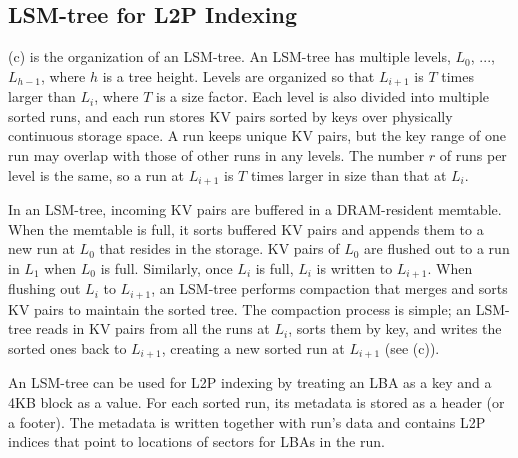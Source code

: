 \begin{comment}
\begin{figure}[t]
\centering
\texttt{[image: figs/OSDI/koo/lsm.eps]}
\vspace{-10pt}
\caption{\fixme{LSM-tree indexing}}
\vspace{-15pt}
\label{fig:LSM-tree}
\end{figure}
\end{comment}


\subsection{LSM-tree for L2P Indexing}
\label{sec:back:lsm-tree}
(c) is the organization of an LSM-tree.  An LSM-tree has
multiple levels, $L_0$, ..., $L_{h-1}$, where $h$ is a tree height.  Levels are
organized so that $L_{i+1}$ is $T$ times larger than $L_{i}$, where $T$ is a
size factor. Each level is also divided into multiple sorted runs, and each run
stores KV pairs sorted by keys over physically continuous storage space.  A run
keeps unique KV pairs, but the key range of one run may overlap with those of
other runs in any levels. The number $r$ of runs per level is the same, so a
run at $L_{i+1}$ is $T$ times larger in size than that at $L_i$.

In an LSM-tree, incoming KV pairs are buffered in a DRAM-resident memtable.
When the memtable is full, it sorts buffered KV pairs and appends them to a new
run at $L_0$ that resides in the storage.  KV pairs of $L_0$ are flushed out to
a run in $L_1$ when $L_0$ is full.  Similarly, once $L_i$ is full, $L_i$ is
written to $L_{i+1}$.  When flushing out $L_i$ to $L_{i+1}$, an LSM-tree
performs compaction that merges and sorts KV pairs to maintain the sorted tree.
The compaction process is simple; an LSM-tree reads in KV pairs from all the
runs at $L_i$, sorts them by key, and writes the sorted ones back to $L_{i+1}$,
creating a new sorted run at $L_{i+1}$ (see (c)).

An LSM-tree can be used for L2P indexing by treating an LBA
as a key and a 4KB block as a value.  For each sorted run, its metadata
is stored as a header (or a footer).  The metadata is written
together with run's data and contains L2P indices 
that point to locations of sectors for LBAs in the run.

